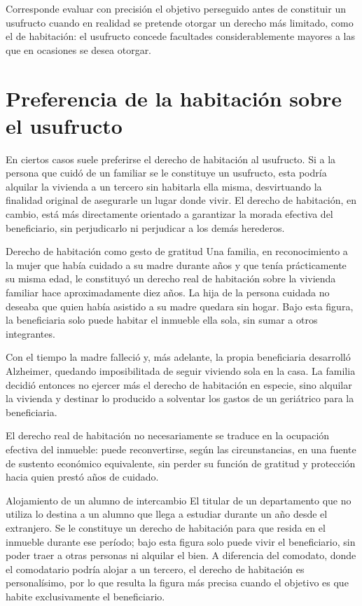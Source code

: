 \documentclass[12pt,oneside]{book}
\begin{document}
\begin{important}
Corresponde evaluar con precisión el objetivo perseguido antes de constituir un usufructo cuando en realidad se pretende otorgar un derecho más limitado, como el de habitación: el usufructo concede facultades considerablemente mayores a las que en ocasiones se desea otorgar.
\end{important}

\section{Preferencia de la habitación sobre el usufructo}

En ciertos casos suele preferirse el derecho de habitación al usufructo. Si a la persona que cuidó de un familiar se le constituye un usufructo, esta podría alquilar la vivienda a un tercero sin habitarla ella misma, desvirtuando la finalidad original de asegurarle un lugar donde vivir. El derecho de habitación, en cambio, está más directamente orientado a garantizar la morada efectiva del beneficiario, sin perjudicarlo ni perjudicar a los demás herederos.

\begin{example}{Derecho de habitación como gesto de gratitud}
Una familia, en reconocimiento a la mujer que había cuidado a su madre durante años y que tenía prácticamente su misma edad, le constituyó un derecho real de habitación sobre la vivienda familiar hace aproximadamente diez años. La hija de la persona cuidada no deseaba que quien había asistido a su madre quedara sin hogar. Bajo esta figura, la beneficiaria solo puede habitar el inmueble ella sola, sin sumar a otros integrantes.

Con el tiempo la madre falleció y, más adelante, la propia beneficiaria desarrolló Alzheimer, quedando imposibilitada de seguir viviendo sola en la casa. La familia decidió entonces no ejercer más el derecho de habitación en especie, sino alquilar la vivienda y destinar lo producido a solventar los gastos de un geriátrico para la beneficiaria.

El derecho real de habitación no necesariamente se traduce en la ocupación efectiva del inmueble: puede reconvertirse, según las circunstancias, en una fuente de sustento económico equivalente, sin perder su función de gratitud y protección hacia quien prestó años de cuidado.
\end{example}

\begin{example}{Alojamiento de un alumno de intercambio}
El titular de un departamento que no utiliza lo destina a un alumno que llega a estudiar durante un año desde el extranjero. Se le constituye un derecho de habitación para que resida en el inmueble durante ese período; bajo esta figura solo puede vivir el beneficiario, sin poder traer a otras personas ni alquilar el bien. A diferencia del comodato, donde el comodatario podría alojar a un tercero, el derecho de habitación es personalísimo, por lo que resulta la figura más precisa cuando el objetivo es que habite exclusivamente el beneficiario.
\end{example}
\end{document}
